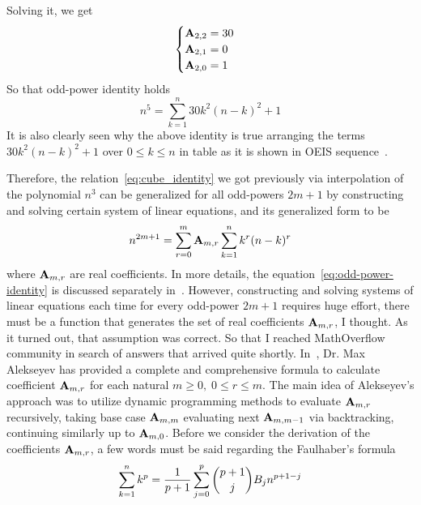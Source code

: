 Solving it, we get
\begin{equation*}
    \begin{cases}
        {\mathbf{A}} \sb{2,2} = 30 \\
        {\mathbf{A}} \sb{2,1} = 0 \\
        {\mathbf{A}} \sb{2,0} = 1
    \end{cases}
\end{equation*}
So that odd-power identity holds
\begin{equation*}
    n^5 = \sum_{k=1}^{n} 30k^2(n-k)^2 + 1
\end{equation*}
It is also clearly seen
why the above identity is true arranging the terms $30k^2(n-k)^2 + 1$ over $0 \leq k \leq n$ in table as
it is shown in OEIS sequence~\cite{kolosov2018fifth}.

Therefore, the relation~\eqref{eq:cube_identity} we got previously via interpolation of the polynomial $n^3$
can be generalized for all odd-powers $2m+1$ by constructing and solving certain system of linear equations,
and its generalized form to be
\begin{equation}
    n^{2m+1} = \sum_{r=0}^{m} {\mathbf{A}} \sb{m,r} \sum_{k=1}^{n} k^{r} (n-k)^{r}\label{eq:odd-power-identity}
\end{equation}
where ${\mathbf{A}} \sb{m,r}$ are real coefficients.
In more details, the equation~\eqref{eq:odd-power-identity} is discussed
separately in~\cite{kolosov2022106, kolosov2023polynomial}.
However, constructing and solving systems of linear equations each time for every odd-power $2m+1$ requires huge effort,
there must be a function that generates the set of real coefficients ${\mathbf{A}} \sb{m,r}$, I thought.
As it turned out, that assumption was correct.
So that I reached MathOverflow community in search of answers that arrived quite shortly.
In~\cite{alekseyev2018mathoverflow}, Dr. Max Alekseyev has provided a complete and comprehensive formula to calculate
coefficient ${\mathbf{A}} \sb{m,r}$ for each natural $m\geq 0, \; 0 \leq r \leq m$.
The main idea of Alekseyev's approach was to utilize dynamic programming methods to evaluate ${\mathbf{A}} \sb{m,r}$ recursively,
taking base case ${\mathbf{A}} \sb{m,m}$ evaluating next ${\mathbf{A}} \sb{m,m-1}$ via backtracking,
continuing similarly up to ${\mathbf{A}} \sb{m,0}$.
Before we consider the derivation of the coefficients ${\mathbf{A}} \sb{m,r}$,
a few words must be said regarding the Faulhaber's formula
\begin{equation*}
    \sum_{k=1}^{n} k^{p} = \frac{1}{p+1}\sum_{j=0}^{p} \binom{p+1}{j} {B}\sb{j} n^{p+1-j}
\end{equation*}

